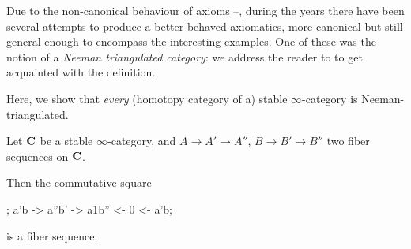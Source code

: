 \begin{remark}
Due to the non\hyp{}canonical behaviour of axioms --, during the years there have been several attempts to produce a better\hyp{}behaved axiomatics, more canonical but still general enough to encompass the interesting examples. One of these was the notion of a \emph{Neeman triangulated category}: we address the reader to \cite{Neeman1991221} to get acquainted with the definition.

Here, we show that \emph{every} (homotopy category of a) stable $\infty$\hyp{}category is Neeman\hyp{}triangulated.
\begin{proposition}
Let $\mathbf{C}$ be a stable $\infty$\hyp{}category, and $A\to A'\to A''$, $B\to B'\to B''$ two fiber sequences on $\mathbf{C}$.

Then the commutative square
\begin{center}
\begin{kD}
;
\mor a'b -> a''b' -> a1b'' <- 0 <- a'b;
\end{kD}
\end{center}
is a fiber sequence.
\end{proposition}
\end{remark}
